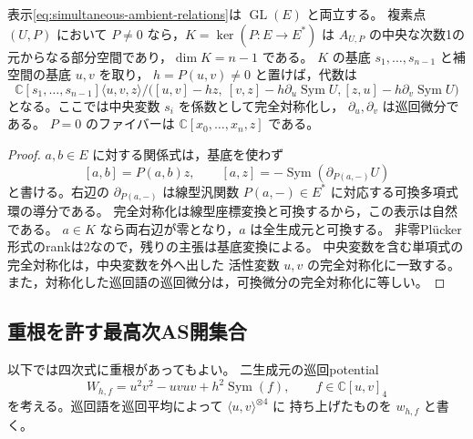 \begin{lemma}[座標変換と非零方向での表示]
\label{lem:simultaneous-coordinate-free}
表示\eqref{eq:simultaneous-ambient-relations}は $\operatorname{GL}(E)$ と両立する。
複素点 $(U,P)$ において $P\ne0$ なら，$K=\ker(P:E\to E^*)$ は
$A_{U,P}$ の中央な次数1の元からなる部分空間であり，$\dim K=n-1$ である。
$K$ の基底 $s_1,\ldots,s_{n-1}$ と補空間の基底 $u,v$ を取り，
$h=P(u,v)\ne0$ と置けば，代数は
\begin{equation}\label{eq:simultaneous-active-presentation}
 \mathbb C[s_1,\ldots,s_{n-1}]\langle u,v,z\rangle/
 \bigl([u,v]-hz,\ [v,z]-h\partial_u\operatorname{Sym}U,
                 [z,u]-h\partial_v\operatorname{Sym}U\bigr)
\end{equation}
となる。ここでは中央変数 $s_i$ を係数として完全対称化し，
$\partial_u,\partial_v$ は巡回微分である。
$P=0$ のファイバーは $\mathbb C[x_0,\ldots,x_n,z]$ である。
\end{lemma}
\begin{proof}
$a,b\in E$ に対する関係式は，基底を使わず
\[
 [a,b]=P(a,b)z,\qquad
 [a,z]=-\operatorname{Sym}(\partial_{P(a,-)}U)
\]
と書ける。右辺の $\partial_{P(a,-)}$ は線型汎関数
$P(a,-)\in E^*$ に対応する可換多項式環の導分である。
完全対称化は線型座標変換と可換するから，この表示は自然である。
$a\in K$ なら両右辺が零となり，$a$ は全生成元と可換する。
非零Pl\"ucker形式のrankは2なので，残りの主張は基底変換による。
中央変数を含む単項式の完全対称化は，中央変数を外へ出した
活性変数 $u,v$ の完全対称化に一致する。
また，対称化した巡回語の巡回微分は，可換微分の完全対称化に等しい。
\end{proof}

\subsection{重根を許す最高次AS開集合}

以下では四次式に重根があってもよい。
二生成元の巡回potential
\begin{equation}\label{eq:simultaneous-cubic-potential}
 W_{h,f}=u^2v^2-uvuv+h^2\operatorname{Sym}(f),
 \qquad f\in\mathbb C[u,v]_4
\end{equation}
を考える。巡回語を巡回平均によって $\langle u,v\rangle^{\otimes4}$ に
持ち上げたものを $w_{h,f}$ と書く。

